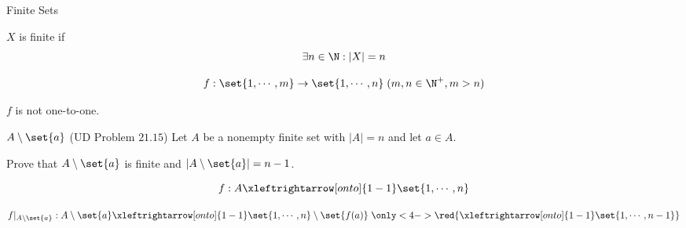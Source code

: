 
\begin{frame}{}
  \begin{center}
    {\LARGE Finite Sets}
  \end{center}


  \pause
  \begin{quote}
    \begin{center}
      {\large {}}
    \end{center}
  \end{quote}
\end{frame}


\begin{frame}{}
  \begin{definition}[Finite]
    $X$ is finite if
    \[
      \exists n \in \N: |X| = n
    \]
  \end{definition}

  \pause
  \vspace{0.60cm}
  \begin{theorem}
    \[
      f: \set{1, \cdots, m} \to \set{1, \cdots, n} \; (m,n \in \N^{+}, m > n)
    \]

    $f$ is not one-to-one.
  \end{theorem}
\end{frame}

\begin{frame}{}
  \begin{exampleblock}{$A \setminus \set{a}$ (UD Problem $21.15$)}
    Let $A$ be a nonempty finite set with $|A| = n$ and let $a \in A$.

    Prove that $A \setminus \set{a}$ is finite and $|A \setminus \set{a}| = n - 1$.
  \end{exampleblock}

  \pause
  \[
    f: A \xleftrightarrow[onto]{1-1} \set{1, \cdots, n}
  \]

  \pause
  \[
    f|_{A \setminus \set{a}}: A \setminus \set{a} \xleftrightarrow[onto]{1-1} \set{1, \cdots, n} \setminus \set{f(a)} \;
    \only<4->{\red{\xleftrightarrow[onto]{1-1} \set{1, \cdots, n - 1}}}
  \]
\end{frame}

